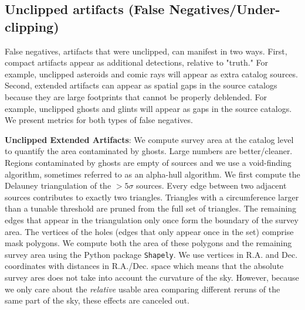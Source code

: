 \documentclass[DM,authoryear,toc]{lsstdoc}
\begin{document}
\subsection{Unclipped artifacts (False Negatives/Under-clipping)}

False negatives, artifacts that were unclipped, can manifest in two ways.
First, compact artifacts appear as additional detections, relative to "truth."
For example, unclipped asteroids and comic rays will appear as extra catalog sources.
Second, extended artifacts can appear as spatial gaps in the source catalogs because they are large footprints that cannot be properly deblended.
For example, unclipped ghosts and glints will appear as gaps in the source catalogs.
We present metrics for both types of false negatives.

\textbf{Unclipped Extended Artifacts}:
We compute survey area at the catalog level to quantify the area contaminated by ghosts.
Large numbers are better/cleaner.
Regions contaminated by ghosts are empty of sources and we use a void-finding algorithm,  sometimes referred to as an alpha-hull algorithm.
We first compute the Delauney triangulation of the  $> 5\sigma$ sources.
Every edge between two adjacent sources contributes to exactly two triangles.
Triangles with a circumference larger than a tunable threshold are pruned from the full set of triangles.
The remaining edges that appear in the triangulation only once form the boundary of the  survey area.
The vertices of the holes (edges that only appear once in the set) comprise mask polygons.
We compute both the area of these polygons and the remaining survey area using the Python package \texttt{Shapely}.
We use vertices in R.A. and Dec. coordinates with distances in R.A./Dec. space which means that the absolute survey ares does not take into account the curvature of the sky.
However,  because we only care about the \emph{relative} usable area comparing different reruns of the same part of the sky, these effects are canceled out.

\end{document}
